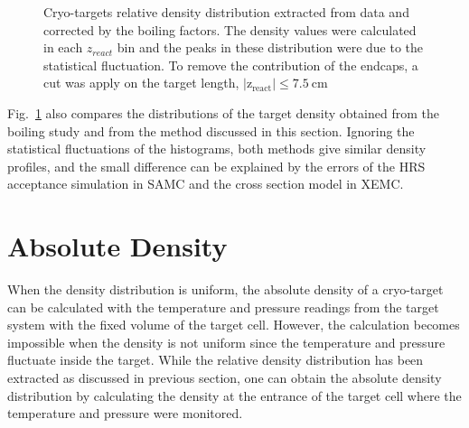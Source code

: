 \begin{figure}[!ht]
\begin{center}
    \hfill
    \caption[Cryo-targets relative density distribution]{\footnotesize{Cryo-targets relative density distribution extracted from data and corrected by the boiling factors. The density values were calculated in each $z_{react}$ bin and the peaks in these distribution were due to the statistical fluctuation. To remove the contribution of the endcaps, a cut was apply on the target length, $\mathrm{|z_{react}|\leq 7.5~cm}$}}
    \label{cryo_den_comp}
  \end{center}
\end{figure}

 Fig.~\ref{cryo_den_comp} also compares the distributions of the target density obtained from the boiling study and from the method discussed in this section. Ignoring the statistical fluctuations of the histograms, both methods give similar density profiles, and the small difference can be explained by the errors of the HRS acceptance simulation in SAMC and the cross section model in XEMC.
 
\section{Absolute Density}
 When the density distribution is uniform, the absolute density of a cryo-target can be calculated with the temperature and pressure readings from the target system with the fixed volume of the target cell. However, the calculation becomes impossible when the density is not uniform since the temperature and pressure fluctuate inside the target. While the relative density distribution has been extracted as discussed in previous section, one can obtain the absolute density distribution by calculating the density at the entrance of the target cell where the temperature and pressure were monitored.
 

